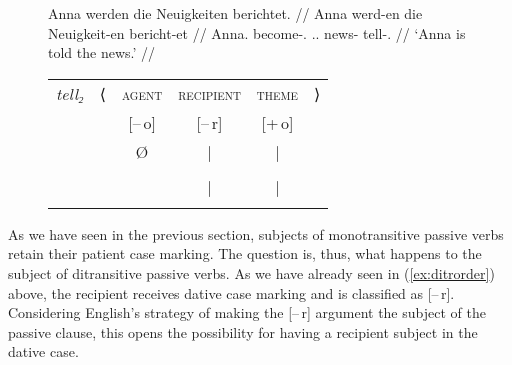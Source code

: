 \begin{figure}
\a\label{ex:gerditrpass_pass2}%
\begingl
	\gla Anna werden die Neuigkeiten berichtet. //
	\glb Anna werd-en die Neuigkeit-en bericht-et //
	\glc Anna.\Dat{} become-\Tpl{}.\Prs{} \Def{}.\Nom{}.\Pl{} news-\Pl{}
		tell-\Pst{}.\Ptcp{} //
	\glft `Anna is told the news.' //
\endgl
\medskip\\
\begin{tabular}[t]{@{} >{\itshape}l l c c c r}
tell₂
	& ⟨
	& \textsc{agent}
	& \textsc{recipient}
	& \textsc{theme}
	& ⟩
	\\
%
	& %
	& [–\,o]
	& [–\,r]
	& [+\,o]
	& %
	\\

%
	& %
	& Ø
	& |
	& |
	& %
	\\

%
	& %
	& %
	& \Obj*
	& \Subj
	& %
	\\

%
	& %
	& %
	& |
	& |
	& %
	\\

%
	& %
	& %
	& \fw{Anna}
	& \fw{news}
	& %
	\\
\end{tabular}

\xe
\end{figure}

As we have seen in the previous section, subjects of monotransitive passive
verbs retain their patient case marking. The question is, thus, what happens to
the subject of ditransitive passive verbs. As we have already seen in 
(\ref{ex:ditrorder}) above, the recipient receives dative case marking and is
classified as [–\,r]. Considering English's strategy of making the [–\,r]
argument the subject of the passive clause, this opens the possibility for
having a recipient subject in the dative case.


